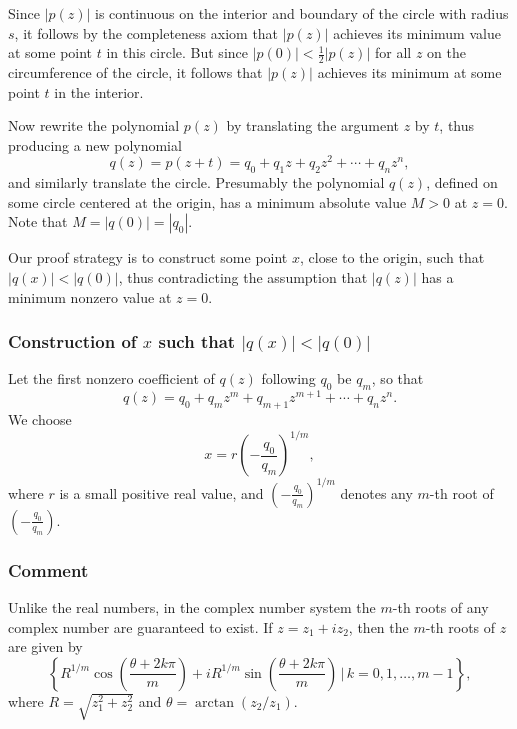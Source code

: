 Since $|p(z)|$ is continuous on the interior and boundary of the circle with radius $s$, it follows by the completeness axiom that $|p(z)|$ achieves its minimum value at some point $t$ in this circle. But since $|p(0)| < \frac{1}{2} |p(z)|$ for all $z$ on the circumference of the circle, it follows that $|p(z)|$ achieves its minimum at some point $t$ in the interior.

Now rewrite the polynomial $p(z)$ by translating the argument $z$ by $t$, thus producing a new polynomial
\[
	q(z) = p(z + t) = q_0 + q_1 z + q_2 z^2 + \cdots + q_n z^n,
\]
and similarly translate the circle. Presumably the polynomial $q(z)$, defined on some circle centered at the origin, has a minimum absolute value $M > 0$ at $z = 0$. Note that $M = |q(0)| = |q_0|$.

Our proof strategy is to construct some point $x$, close to the origin, such that $|q(x)| < |q(0)|$, thus contradicting the assumption that $|q(z)|$ has a minimum nonzero value at $z = 0$.

\subsubsection*{Construction of $x$ such that $|q(x)| < |q(0)|$}
Let the first nonzero coefficient of $q(z)$ following $q_0$ be $q_m$, so that
\[
	q(z) = q_0 + q_m z^m + q_{m+1} z^{m+1} + \cdots + q_n z^n.
\]
We choose
\[
	x = r \left(-\frac{q_0}{q_m}\right)^{1/m},
\]
where $r$ is a small positive real value, and $\left(-\frac{q_0}{q_m}\right)^{1/m}$ denotes any $m$-th root of $\left(-\frac{q_0}{q_m}\right)$.

\subsubsection*{Comment}
Unlike the real numbers, in the complex number system the $m$-th roots of any complex number are guaranteed to exist. If $z = z_1 + i z_2$, then the $m$-th roots of $z$ are given by
\[
	\left\{ R^{1/m} \cos\left(\frac{\theta + 2k\pi}{m}\right) + i R^{1/m} \sin\left(\frac{\theta + 2k\pi}{m}\right) \,\bigg|\, k = 0, 1, \ldots, m-1 \right\},
\]
where $R = \sqrt{z_1^2 + z_2^2}$ and $\theta = \arctan(z_2 / z_1)$.


